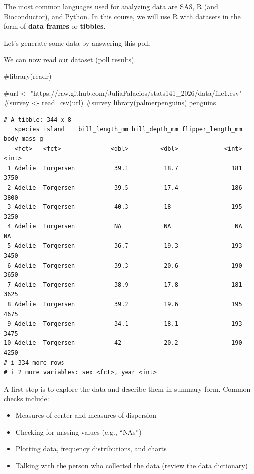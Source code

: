 \documentclass[
  letterpaper,
  DIV=11,
  numbers=noendperiod]{scrreprt}
\newenvironment{Shaded}{\begin{snugshade}}{\end{snugshade}}
\newcommand{\CommentTok}[1]{\textcolor[rgb]{0.37,0.37,0.37}{#1}}
\newcommand{\FunctionTok}[1]{\textcolor[rgb]{0.28,0.35,0.67}{#1}}
\newcommand{\NormalTok}[1]{\textcolor[rgb]{0.00,0.23,0.31}{#1}}
\providecommand{\tightlist}{%
  \setlength{\itemsep}{0pt}\setlength{\parskip}{0pt}}
\begin{document}
The most common languages used for analyzing data are SAS, R (and
Bioconductor), and Python. In this course, we will use R with datasets
in the form of \textbf{data frames} or \textbf{tibbles}.

Let's generate some data by answering this poll.

We can now read our dataset (poll results).

\begin{Shaded}
\begin{Highlighting}[]
\CommentTok{\#library(readr)}

\CommentTok{\#url \textless{}{-} "https://raw.github.com/JuliaPalacios/stats141\_2026/data/file1.csv"}
\CommentTok{\#survey \textless{}{-} read\_csv(url) }
\CommentTok{\#survey}
\FunctionTok{library}\NormalTok{(palmerpenguins)}
\NormalTok{penguins}
\end{Highlighting}
\end{Shaded}

\begin{verbatim}
# A tibble: 344 x 8
   species island    bill_length_mm bill_depth_mm flipper_length_mm body_mass_g
   <fct>   <fct>              <dbl>         <dbl>             <int>       <int>
 1 Adelie  Torgersen           39.1          18.7               181        3750
 2 Adelie  Torgersen           39.5          17.4               186        3800
 3 Adelie  Torgersen           40.3          18                 195        3250
 4 Adelie  Torgersen           NA            NA                  NA          NA
 5 Adelie  Torgersen           36.7          19.3               193        3450
 6 Adelie  Torgersen           39.3          20.6               190        3650
 7 Adelie  Torgersen           38.9          17.8               181        3625
 8 Adelie  Torgersen           39.2          19.6               195        4675
 9 Adelie  Torgersen           34.1          18.1               193        3475
10 Adelie  Torgersen           42            20.2               190        4250
# i 334 more rows
# i 2 more variables: sex <fct>, year <int>
\end{verbatim}

A first step is to explore the data and describe them in summary form.
Common checks include:

\begin{itemize}
\tightlist
\item
  Measures of center and measures of dispersion\\
\item
  Checking for missing values (e.g., ``NAs'')\\
\item
  Plotting data, frequency distributions, and charts\\
\item
  Talking with the person who collected the data (review the data
  dictionary)
\end{itemize}
\end{document}
